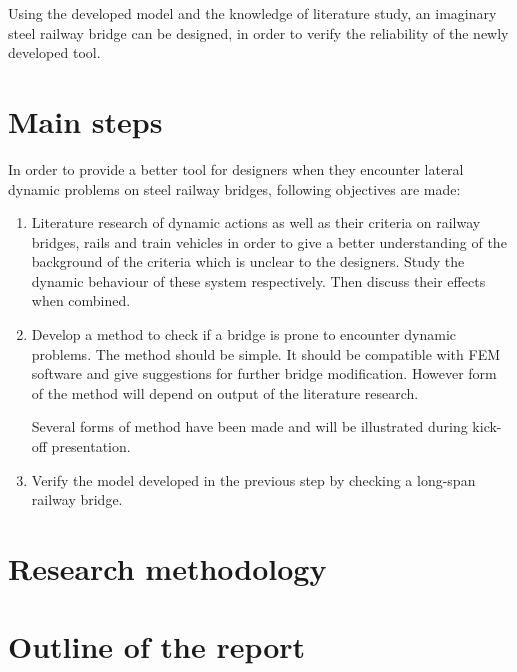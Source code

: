 Using the developed model and the knowledge of literature study, an imaginary steel railway bridge can be designed, in order to verify the reliability of the newly developed tool. 

\section{Main steps}

In order to provide a better tool for designers when they encounter lateral dynamic problems on steel railway bridges, following objectives are made:

\begin{enumerate}

\item Literature research of dynamic actions as well as their criteria on railway bridges, rails and train vehicles in order to give a better understanding of the background of the criteria which is unclear to the designers. Study the dynamic behaviour of these system respectively. Then discuss their effects when combined.

\item Develop a method to check if a bridge is prone to encounter dynamic problems. The method should be simple. It should be compatible with FEM software and give suggestions for further bridge modification. However form of the method will depend on output of the literature research.

Several forms of method have been made and will be illustrated during kick-off presentation.

\item Verify the model developed in the previous step by checking a long-span railway bridge. 

\end{enumerate}

\section{Research methodology}
\section{Outline of the report}

